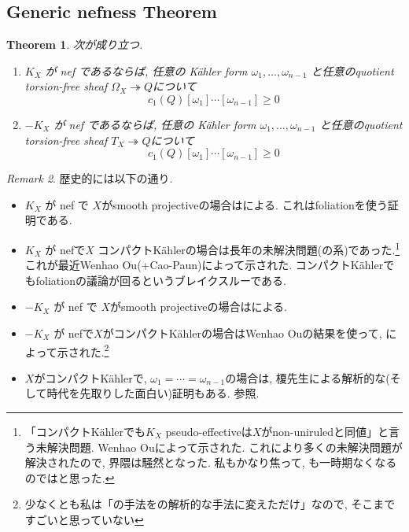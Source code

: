 \documentclass[dvipdfmx,a4paper,11pt]{article} %
\newtheorem{thm}{Theorem}[section]
\theoremstyle{definition}
\theoremstyle{remark}
\newtheorem{rem}[thm]{Remark}
\numberwithin{equation}{section}
\begin{document}
\subsection{Generic nefness Theorem}

\begin{thm}\cite{Miy87, Eno88, Cao13, Gue16, Ou23, Ou25, CP25, MWWZ25, IJZ25}
\label{thm-generic-nefness}
次が成り立つ. 
\begin{enumerate}
\item \(K_X\) が nef であるならば,
 任意の Kähler form \(\omega_1, \ldots, \omega_{n-1}\) と任意のquotient torsion-free sheaf $\Omega_{X} \twoheadrightarrow Q$について
 $$
 c_1(Q) [\omega_1] \cdots [\omega_{n-1}] \ge 0
 $$
\item  \(-K_X\) が nef であるならば,
 任意の Kähler form \(\omega_1, \ldots, \omega_{n-1}\) と任意のquotient torsion-free sheaf $T_{X} \twoheadrightarrow Q$について
 $$
 c_1(Q) [\omega_1] \cdots [\omega_{n-1}]  \ge 0
 $$
 \end{enumerate}
\end{thm}
\begin{rem}
歴史的には以下の通り. 
\begin{itemize}
\item \(K_X\) が nef で $X$がsmooth projectiveの場合は\cite{Miy87}による. これはfoliationを使う証明である. 
\item\(K_X\) が nefで$X$ コンパクトK\"ahlerの場合は長年の未解決問題(の系)であった.\footnote{「コンパクトK\"ahlerでも$K_X$ pseudo-effectiveは$X$がnon-uniruledと同値」と言う未解決問題. Wenhao Ou\cite{Ou25}によって示された. これにより多くの未解決問題が解決されたので, 界隈は騒然となった. 私もかなり焦って, \cite{IJZ25}も一時期なくなるのではと思った.} これが最近Wenhao Ou\cite{Ou25}(+Cao-Paun\cite{CP25})によって示された. コンパクトK\"ahlerでもfoliationの議論が回るというブレイクスルーである. 
\item \(-K_X\) が nef で  $X$がsmooth projectiveの場合は\cite{Ou23}による. 
\item   \(-K_X\) が nefで$X$がコンパクトK\"ahlerの場合はWenhao Ou\cite{Ou25}の結果を使って, \cite{MWWZ25, IJZ25}によって示された.\footnote{少なくとも私は「\cite{Ou23}の手法を\cite{CP25}の解析的な手法に変えただけ」なので, そこまですごいと思っていない}
\item $X$がコンパクトK\"ahlerで, $\omega_1= \cdots =\omega_{n-1}$の場合は, 榎先生による解析的な(そして時代を先取りした面白い)証明もある. \cite{Eno88, Cao13, Gue16}参照. 
\end{itemize}
\end{rem}
\end{document}
